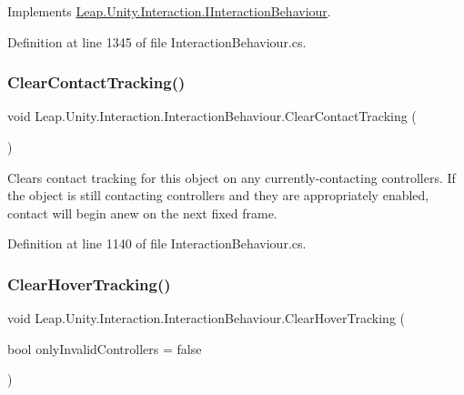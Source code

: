 Implements \mbox{\hyperlink{interface_leap_1_1_unity_1_1_interaction_1_1_i_interaction_behaviour_a2e68a48e5b84237fa5963406b08e3eba}{Leap.\+Unity.\+Interaction.\+I\+Interaction\+Behaviour}}.



Definition at line 1345 of file Interaction\+Behaviour.\+cs.

\mbox{\label{class_leap_1_1_unity_1_1_interaction_1_1_interaction_behaviour_a79cebc9b1c8aa1296fd362c92a31ee05}} 
\subsubsection{\texorpdfstring{ClearContactTracking()}{ClearContactTracking()}}
{\footnotesize\ttfamily void Leap.\+Unity.\+Interaction.\+Interaction\+Behaviour.\+Clear\+Contact\+Tracking (\begin{DoxyParamCaption}{ }\end{DoxyParamCaption})}



Clears contact tracking for this object on any currently-\/contacting controllers. If the object is still contacting controllers and they are appropriately enabled, contact will begin anew on the next fixed frame. 



Definition at line 1140 of file Interaction\+Behaviour.\+cs.

\mbox{\label{class_leap_1_1_unity_1_1_interaction_1_1_interaction_behaviour_aeb6b978ba2cb9b28a72d04ec0c3944b3}} 
\subsubsection{\texorpdfstring{ClearHoverTracking()}{ClearHoverTracking()}}
{\footnotesize\ttfamily void Leap.\+Unity.\+Interaction.\+Interaction\+Behaviour.\+Clear\+Hover\+Tracking (\begin{DoxyParamCaption}\item[{bool}]{only\+Invalid\+Controllers = {\ttfamily false} }\end{DoxyParamCaption})}



